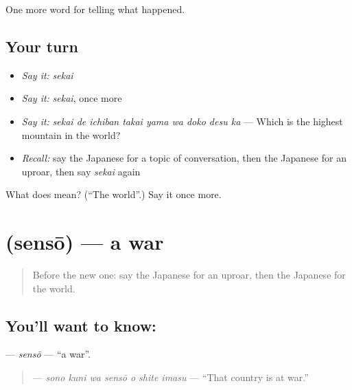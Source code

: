 \begin{grammarlens}[title={What you've built}]
One more word for telling what happened.
\end{grammarlens}

\subsection*{Your turn}
\begin{itemize}
\raggedright
  \item \emph{Say it:} \emph{sekai}
  \item \emph{Say it:} \emph{sekai}, once more
  \item \emph{Say it:} \emph{sekai de ichiban takai yama wa doko desu ka} — Which is the highest mountain in the world?
  \item \emph{Recall:} say the Japanese for a topic of conversation, then the Japanese for an uproar, then say \emph{sekai} again
\end{itemize}

\begin{tcolorbox}[breakable,colback=teal!4,colframe=teal!35!black,title={Before you move on}]
What does  mean? (\textquotedblleft{}The world\textquotedblright{}.) Say it once more.
\end{tcolorbox}
\section[\texorpdfstring{\ja{せんそう} (sensō)}{せんそう (sensō)}]{ (sensō) — a war}

\label{lesson:JA-C282-sensou}



\begin{quote}
Before the new one: say the Japanese for an uproar, then the Japanese for the world.
\end{quote}

\subsection*{You'll want to know: }
\textbf{} — \emph{sensō} — \textquotedblleft{}a war\textquotedblright{}.

\begin{quote}
\textbf{   } — \emph{sono kuni wa sensō o shite imasu} — \textquotedblleft{}That country is at war.\textquotedblright{}
\end{quote}

